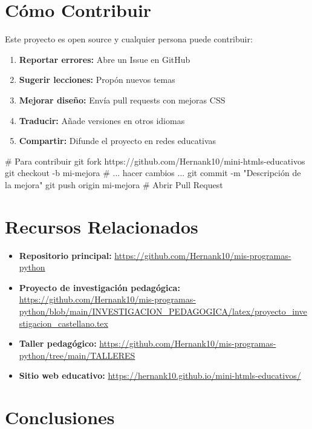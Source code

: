 \documentclass[12pt,spanish]{article}
\begin{document}
\section{Cómo Contribuir}

Este proyecto es open source y cualquier persona puede contribuir:

\begin{enumerate}
    \item \textbf{Reportar errores:} Abre un Issue en GitHub
    \item \textbf{Sugerir lecciones:} Propón nuevos temas
    \item \textbf{Mejorar diseño:} Envía pull requests con mejoras CSS
    \item \textbf{Traducir:} Añade versiones en otros idiomas
    \item \textbf{Compartir:} Difunde el proyecto en redes educativas
\end{enumerate}

\begin{codigo}
# Para contribuir
git fork https://github.com/Hernank10/mini-htmls-educativos
git checkout -b mi-mejora
# ... hacer cambios ...
git commit -m "Descripción de la mejora"
git push origin mi-mejora
# Abrir Pull Request
\end{codigo}

\section{Recursos Relacionados}

\begin{itemize}
    \item \textbf{Repositorio principal:} \url{https://github.com/Hernank10/mis-programas-python}
    \item \textbf{Proyecto de investigación pedagógica:} \url{https://github.com/Hernank10/mis-programas-python/blob/main/INVESTIGACION_PEDAGOGICA/latex/proyecto_investigacion_castellano.tex}
    \item \textbf{Taller pedagógico:} \url{https://github.com/Hernank10/mis-programas-python/tree/main/TALLERES}
    \item \textbf{Sitio web educativo:} \url{https://hernank10.github.io/mini-htmls-educativos/}
\end{itemize}

\section{Conclusiones}
\end{document}
